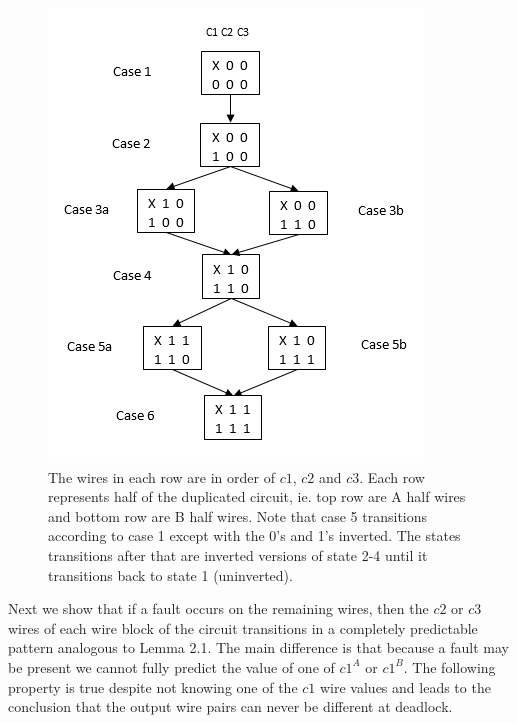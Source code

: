 \documentclass[12pt]{report}
\begin{document}
\begin{figure}
  \centering
    \includegraphics{flowl4c3v2}
  \caption{The wires in each row are in order of $c1$, $c2$ and $c3$.  Each row represents half of the duplicated circuit, ie. top row are A half wires and bottom row are B half wires.  Note that case 5 transitions according to case 1 except with the 0's and 1's inverted.  The states transitions after that are inverted versions of state 2-4 until it transitions back to state 1 (uninverted).}
  \label{fig:l4}
\end{figure}
Next we show that if a fault occurs on the remaining wires, then the $c2$ or $c3$ wires of each wire block of the circuit transitions in a completely predictable pattern analogous to Lemma 2.1.  The main difference is that because a fault may be present we cannot fully predict the value of one of $c1^A$ or $c1^B$.  The following property is true despite not knowing one of the $c1$ wire values and leads to the conclusion that the output wire pairs can never be different at deadlock.  
\end{document}
